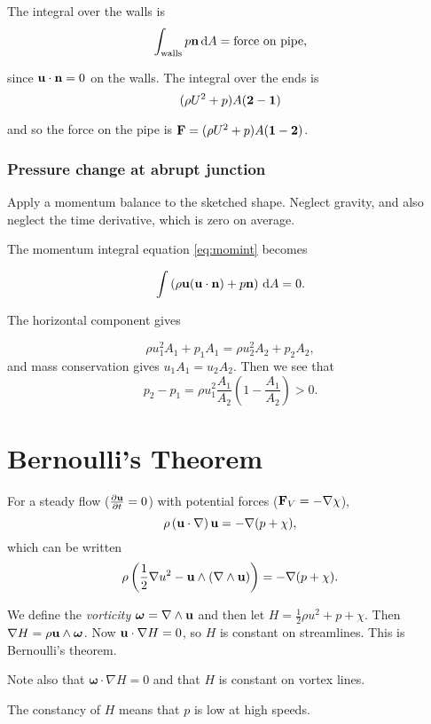 \documentclass{notes}
\newcommand{\bso}{\boldsymbol\omega}
\newcommand{\grad}{\nabla}
\newcommand{\curl}{\nabla\wedge}
\newcommand{\dgrad}[2]{\left(#1\cdot\nabla\right)#2}
\begin{document}
The integral over the walls is
\[
\int_{\text{walls}} p \mathbf{n}\,\mathrm{d} A = \text{force on pipe,}
\]

since $\mathbf{u} \cdot \mathbf{n} = 0$ on the walls.  The integral over the ends is
\[
( \rho U^2 + p) A (\mathbf{2} - \mathbf{1})
\]

and so the force on the pipe is $\mathbf{F} = ( \rho U^2 + p) A (\mathbf{1} - \mathbf{2})$.

\subsubsection*{Pressure change at abrupt junction}

\vspace{3in}

Apply a momentum balance to the sketched shape.  Neglect gravity, and
also neglect the time derivative, which is zero on average.

The momentum integral equation \eqref{eq:momint} becomes

\[
\int \left( \rho \mathbf{u} (\mathbf{u} \cdot\mathbf{n}) + p \mathbf{n}\right)\,\mathrm{d} A = 0.
\]

The horizontal component gives

\[
\rho u_1^2 A_1 + p_1 A_1 = \rho u_2^2 A_2 + p_2 A_2, 
\]
and mass conservation gives $u_1 A_1 = u_2 A_2$.  Then we see that
\[
p_2 -p_1 = \rho u_1^2 \frac{A_1}{A_2} \left( 1 - \frac{A_1}{A_2} \right) > 0.
\]

\section{Bernoulli's Theorem}

For a steady flow ($\frac{\partial \mathbf{u}}{\partial t}=0$) with potential forces ($\vF_V =
-\grad\chi$),
\[
\rho \dgrad{\vu}{\vu} = -\grad(p+\chi),
\]
which can be written
\begin{equation}\label{eq:bern1}
\rho \left( \frac{1}{2}\grad u^2 - \vu \wedge \left( \curl\vu \right)
\right) = -\grad (p+\chi).
\end{equation}

We define the \emph{vorticity} $\bso = \curl{\vu}$ and then let $H =
\frac{1}{2}\rho u^2 + p + \chi$.  Then $\grad H = \rho \vu \wedge
\bso$.  Now $\vu \cdot \grad{H} = 0$, so $H$ is constant on streamlines.
This is Bernoulli's theorem.

Note also that $\bso \cdot \grad{H} = 0$ and that $H$ is constant on
vortex lines.

The constancy of $H$ means that $p$ is low at high speeds.
\end{document}
